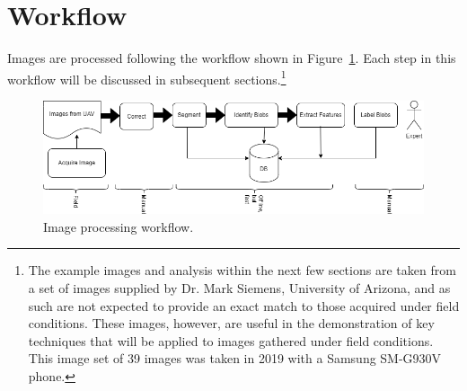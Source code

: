 \documentclass[letterpaper]{article}
\begin{document}
\section{Workflow}
Images are processed following the workflow shown in Figure~\ref{fig:workflow}. Each step in this workflow will be discussed in subsequent sections.\footnote{The example images and analysis within the next few sections are taken from a set of images supplied by Dr. Mark Siemens, University of Arizona, and as such are not expected to provide an exact match to those acquired under field conditions. These images, however, are useful in the demonstration of key techniques that will be applied to images gathered under field conditions. This image set of 39 images was taken in 2019 with a Samsung SM-G930V phone.}
\begin{figure}[H]
	\centering
	\includegraphics[width=1\linewidth]{./figures/workflow.drawio.png}
	\caption{Image processing workflow.}
	\label{fig:workflow}	
\end{figure}
\end{document}
